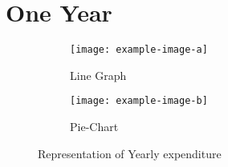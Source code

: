 \documentclass{article}
\begin{document}
\section{One Year}
\begin{figure}[htbp]
    \centering
    \begin{subfigure}{0.45\textwidth}
        \texttt{[image: example-image-a]}
        \caption{Line Graph}
    \end{subfigure}
    \hfill
    \begin{subfigure}{0.45\textwidth}
        \texttt{[image: example-image-b]}
        \caption{Pie-Chart}
    \end{subfigure}
    \caption{Representation of Yearly expenditure}
\end{figure}
\end{document}

